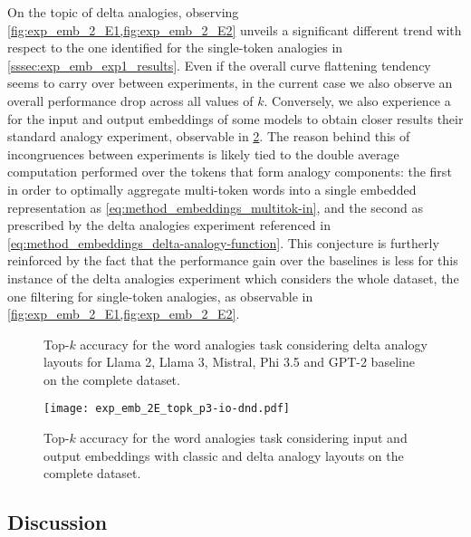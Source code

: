 On the topic of delta analogies, observing \cref{fig:exp_emb_2_E1,fig:exp_emb_2_E2} unveils a significant different trend with respect to the one identified for the single-token analogies in \cref{sssec:exp_emb_exp1_results}.
Even if the overall curve flattening tendency seems to carry over between experiments, in the current case we also observe an overall performance drop across all values of $k$.
Conversely, we also experience a  for the input and output embeddings of some models to obtain closer results  their standard analogy experiment, observable in \cref{fig:exp_emb_2_E3}.
The reason behind this  of incongruences between experiments is likely tied to the double average computation performed over the tokens that form analogy components: the first in order to optimally aggregate multi-token words into a single embedded representation as \cref{eq:method_embeddings_multitok-in}, and the second as prescribed by the delta analogies experiment referenced in \cref{eq:method_embeddings_delta-analogy-function}.
This conjecture is furtherly reinforced by the fact that the performance gain over the baselines is less  for this instance of the delta analogies experiment which considers the whole dataset,  the one filtering for single-token analogies, as observable in \cref{fig:exp_emb_2_E1,fig:exp_emb_2_E2}.

\begin{figure}[t!]
    \centering
    \caption{Top-$k$ accuracy for the word analogies task considering delta analogy layouts for Llama 2, Llama 3, Mistral, Phi 3.5 and GPT-2 baseline on the complete dataset.}
    \label{fig:exp_emb_2_E}
\end{figure}
\begin{figure}[t!]
    \centering
    \texttt{[image: exp\_emb\_2E\_topk\_p3-io-dnd.pdf]}
    \caption{Top-$k$ accuracy for the word analogies task considering input and output embeddings with classic and delta analogy layouts on the complete dataset.}
    \label{fig:exp_emb_2_E3}
\end{figure}

\subsection{Discussion}\label{ssec:exp_emb_discussion}

